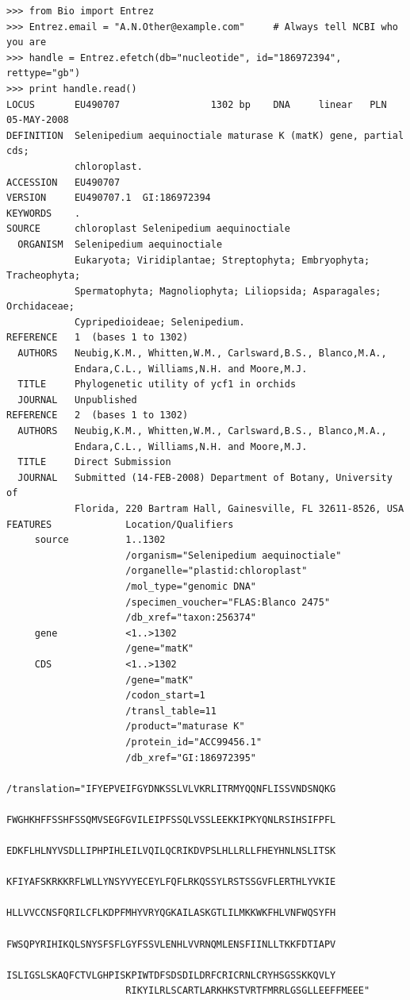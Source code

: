 \documentclass{report}
\begin{document}
\begin{verbatim}
>>> from Bio import Entrez
>>> Entrez.email = "A.N.Other@example.com"     # Always tell NCBI who you are
>>> handle = Entrez.efetch(db="nucleotide", id="186972394", rettype="gb")
>>> print handle.read()
LOCUS       EU490707                1302 bp    DNA     linear   PLN 05-MAY-2008
DEFINITION  Selenipedium aequinoctiale maturase K (matK) gene, partial cds;
            chloroplast.
ACCESSION   EU490707
VERSION     EU490707.1  GI:186972394
KEYWORDS    .
SOURCE      chloroplast Selenipedium aequinoctiale
  ORGANISM  Selenipedium aequinoctiale
            Eukaryota; Viridiplantae; Streptophyta; Embryophyta; Tracheophyta;
            Spermatophyta; Magnoliophyta; Liliopsida; Asparagales; Orchidaceae;
            Cypripedioideae; Selenipedium.
REFERENCE   1  (bases 1 to 1302)
  AUTHORS   Neubig,K.M., Whitten,W.M., Carlsward,B.S., Blanco,M.A.,
            Endara,C.L., Williams,N.H. and Moore,M.J.
  TITLE     Phylogenetic utility of ycf1 in orchids
  JOURNAL   Unpublished
REFERENCE   2  (bases 1 to 1302)
  AUTHORS   Neubig,K.M., Whitten,W.M., Carlsward,B.S., Blanco,M.A.,
            Endara,C.L., Williams,N.H. and Moore,M.J.
  TITLE     Direct Submission
  JOURNAL   Submitted (14-FEB-2008) Department of Botany, University of
            Florida, 220 Bartram Hall, Gainesville, FL 32611-8526, USA
FEATURES             Location/Qualifiers
     source          1..1302
                     /organism="Selenipedium aequinoctiale"
                     /organelle="plastid:chloroplast"
                     /mol_type="genomic DNA"
                     /specimen_voucher="FLAS:Blanco 2475"
                     /db_xref="taxon:256374"
     gene            <1..>1302
                     /gene="matK"
     CDS             <1..>1302
                     /gene="matK"
                     /codon_start=1
                     /transl_table=11
                     /product="maturase K"
                     /protein_id="ACC99456.1"
                     /db_xref="GI:186972395"
                     /translation="IFYEPVEIFGYDNKSSLVLVKRLITRMYQQNFLISSVNDSNQKG
                     FWGHKHFFSSHFSSQMVSEGFGVILEIPFSSQLVSSLEEKKIPKYQNLRSIHSIFPFL
                     EDKFLHLNYVSDLLIPHPIHLEILVQILQCRIKDVPSLHLLRLLFHEYHNLNSLITSK
                     KFIYAFSKRKKRFLWLLYNSYVYECEYLFQFLRKQSSYLRSTSSGVFLERTHLYVKIE
                     HLLVVCCNSFQRILCFLKDPFMHYVRYQGKAILASKGTLILMKKWKFHLVNFWQSYFH
                     FWSQPYRIHIKQLSNYSFSFLGYFSSVLENHLVVRNQMLENSFIINLLTKKFDTIAPV
                     ISLIGSLSKAQFCTVLGHPISKPIWTDFSDSDILDRFCRICRNLCRYHSGSSKKQVLY
                     RIKYILRLSCARTLARKHKSTVRTFMRRLGSGLLEEFFMEEE"

\end{verbatim}
\end{document}

